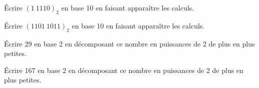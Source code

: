 \documentclass[a4paper,12pt,eval,firamath]{nsi}
\begin{document}
\maketitle

\'Ecrire $(1\ 1110)_2$ en base 10 en faisant apparaître les calculs.\\


\'Ecrire $(1101\ 1011)_2$ en base 10 en faisant apparaître les calculs.\\


\'Ecrire 29 en base 2 en décomposant ce nombre en puissances de 2 de plus en plus petites.\\


\'Ecrire 167 en base 2 en décomposant ce nombre en puissances de 2 de plus en plus petites.\\

\end{document}
